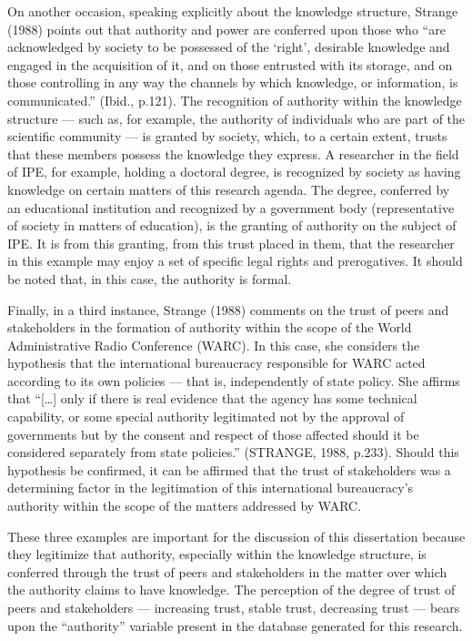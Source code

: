 On another occasion, speaking explicitly about the knowledge structure, Strange (1988) points out that authority and power are conferred upon those who ``are acknowledged by society to be possessed of the `right', desirable knowledge and engaged in the acquisition of it, and on those entrusted with its storage, and on those controlling in any way the channels by which knowledge, or information, is communicated.'' (Ibid., p.121). The recognition of authority within the knowledge structure --- such as, for example, the authority of individuals who are part of the scientific community --- is granted by society, which, to a certain extent, trusts that these members possess the knowledge they express. A researcher in the field of IPE, for example, holding a doctoral degree, is recognized by society as having knowledge on certain matters of this research agenda. The degree, conferred by an educational institution and recognized by a government body (representative of society in matters of education), is the granting of authority on the subject of IPE. It is from this granting, from this trust placed in them, that the researcher in this example may enjoy a set of specific legal rights and prerogatives. It should be noted that, in this case, the authority is formal.

Finally, in a third instance, Strange (1988) comments on the trust of peers and stakeholders in the formation of authority within the scope of the World Administrative Radio Conference (WARC). In this case, she considers the hypothesis that the international bureaucracy responsible for WARC acted according to its own policies --- that is, independently of state policy. She affirms that ``{[}\ldots{]} only if there is real evidence that the agency has some technical capability, or some special authority legitimated not by the approval of governments but by the consent and respect of those affected should it be considered separately from state policies.'' (STRANGE, 1988, p.233). Should this hypothesis be confirmed, it can be affirmed that the trust of stakeholders was a determining factor in the legitimation of this international bureaucracy's authority within the scope of the matters addressed by WARC.

These three examples are important for the discussion of this dissertation because they legitimize that authority, especially within the knowledge structure, is conferred through the trust of peers and stakeholders in the matter over which the authority claims to have knowledge. The perception of the degree of trust of peers and stakeholders --- increasing trust, stable trust, decreasing trust --- bears upon the ``authority'' variable present in the database generated for this research.

